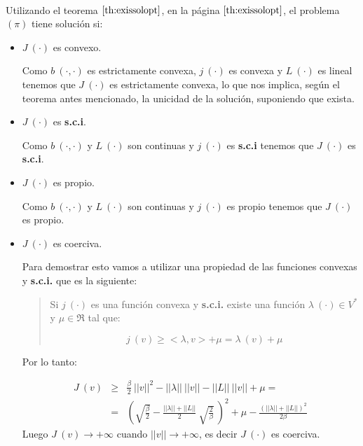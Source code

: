 \begin{demoslema}
\ \newline

Utilizando el teorema $\ref{th:exissolopt}$, en la p\'agina
$\pageref{th:exissolopt}$, el problema $(\pi )$ tiene soluci\'on si:

\begin{itemize}
\item $J\ (\cdot )$ es convexo.\newline

Como $b\ (\cdot ,\cdot )$ es estrictamente convexa, $j\ (\cdot )$ es convexa y
$L\ (\cdot )$ es lineal tenemos que $J\ (\cdot )$ es estrictamente convexa, lo
que nos implica, seg\'un el teorema antes mencionado, la unicidad de la
soluci\'on, suponiendo que exista.

\item $J\ (\cdot )$ es \textbf{s.c.i}.\newline

Como $b\ (\cdot ,\cdot )$ y $L\ (\cdot )$ son continuas y $j\ (\cdot )$ es
\textbf{s.c.i} tenemos que $J\ (\cdot )$ es \textbf{s.c.i}.

\item $J\ (\cdot )$ es propio.\newline

Como $b\ (\cdot ,\cdot )$ y $L\ (\cdot )$ son continuas y $j\ (\cdot )$ es
propio tenemos que $J\ (\cdot )$ es propio.

\item $J\ (\cdot )$ es coerciva.\newline

Para demostrar esto vamos a utilizar una propiedad de las funciones convexas y
\textbf{s.c.i.} que es la siguiente:

\begin{quote}
Si $j\ (\cdot )$ es una funci\'on convexa y \textbf{s.c.i.} existe una funci\'on
$\lambda \ (\cdot ) \in V^*$ y $\mu \in \Re$ tal que:

\begin{displaymath}
j\ (v) \ge <\lambda ,v> + \mu = \lambda \ (v)+\mu
\end{displaymath}

\end{quote}
Por lo tanto:

\begin{eqnarray*}
J\ (v) &\ge & \frac{\beta}{2}\ ||v||^2-||\lambda ||\ ||v||-||L||\ ||v||+\mu = \\
& = & ( \sqrt{\frac{\beta}{2}}-\frac{||\lambda ||+||L||}{2}\
\sqrt{\frac{2}{\beta}}\ )^2+\mu -\frac{(||\lambda ||+||L||)^2}{2\beta }
\end{eqnarray*}
Luego $J\ (v)\to +\infty$ cuando $||v||\to +\infty$, es decir $J\ (\cdot )$ es
coerciva.


\end{itemize}
\end{demoslema}
